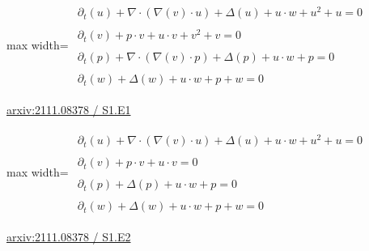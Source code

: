 \documentclass[UTF8,10pt,a4paper,fontset=mac]{ctexart}
\begin{document}
\begin{minipage}{\linewidth}\begin{center}\begin{adjustbox}{max width=\linewidth}$\displaystyle\begin{gathered}\begin{gathered}\partial_{t}(u)+\nabla\cdot(\nabla(v)\cdot u)+\Delta(u)+u\cdot w+u^{2}+u=0\end{gathered}\\[5pt]\begin{gathered}\partial_{t}(v)+p\cdot v+u\cdot v+v^{2}+v=0\end{gathered}\\[5pt]\begin{gathered}\partial_{t}(p)+\nabla\cdot(\nabla(v)\cdot p)+\Delta(p)+u\cdot w+p=0\end{gathered}\\[5pt]\begin{gathered}\partial_{t}(w)+\Delta(w)+u\cdot w+p+w=0\end{gathered}\end{gathered}$\end{adjustbox}\end{center}{\small\href{https://arxiv.org/html/2111.08378#S1.E1}{arxiv:2111.08378 / S1.E1}}\par\end{minipage}\par\vspace{6mm}

\begin{minipage}{\linewidth}\begin{center}\begin{adjustbox}{max width=\linewidth}$\displaystyle\begin{gathered}\begin{gathered}\partial_{t}(u)+\nabla\cdot(\nabla(v)\cdot u)+\Delta(u)+u\cdot w+u^{2}+u=0\end{gathered}\\[5pt]\begin{gathered}\partial_{t}(v)+p\cdot v+u\cdot v=0\end{gathered}\\[5pt]\begin{gathered}\partial_{t}(p)+\Delta(p)+u\cdot w+p=0\end{gathered}\\[5pt]\begin{gathered}\partial_{t}(w)+\Delta(w)+u\cdot w+p+w=0\end{gathered}\end{gathered}$\end{adjustbox}\end{center}{\small\href{https://arxiv.org/html/2111.08378#S1.E2}{arxiv:2111.08378 / S1.E2}}\par\end{minipage}\par\vspace{6mm}
\end{document}
